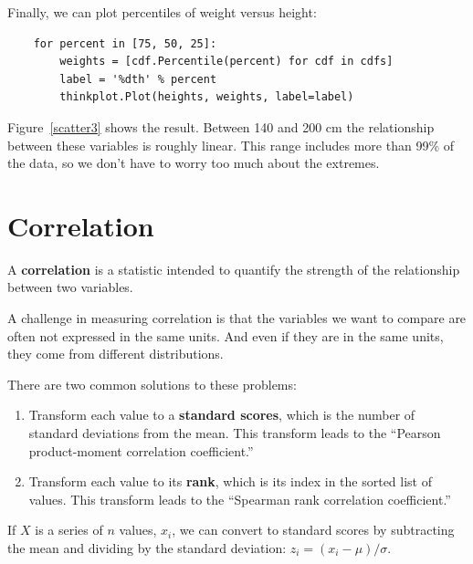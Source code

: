 Finally, we can
plot percentiles of weight versus height:

\begin{verbatim}
    for percent in [75, 50, 25]:
        weights = [cdf.Percentile(percent) for cdf in cdfs]
        label = '%dth' % percent
        thinkplot.Plot(heights, weights, label=label)
\end{verbatim}

Figure~\ref{scatter3} shows the result.  Between 140 and 200 cm
the relationship between these variables is roughly linear.  This range
includes more than 99\% of the data, so we don't have to worry
too much about the extremes.


\section{Correlation}

A {\bf correlation} is a statistic intended to quantify the strength
of the relationship between two variables.

A challenge in measuring correlation is that the variables we want to
compare are often not expressed in the same units.  And even if they
are in the same units, they come from different distributions.

There are two common solutions to these problems:

\begin{enumerate}

\item Transform each value to a {\bf standard scores}, which is the
number of standard deviations from the mean.  
This transform leads to
the ``Pearson product-moment correlation coefficient.''

\item Transform each value to its {\bf rank}, which is its index in
the sorted list of values.  This transform
leads to the ``Spearman rank correlation coefficient.''

\end{enumerate}

If $X$ is a series of $n$ values, $x_i$, we can convert to standard
scores by subtracting the mean and dividing by the standard deviation:
$z_i = (x_i - \mu) / \sigma$.

